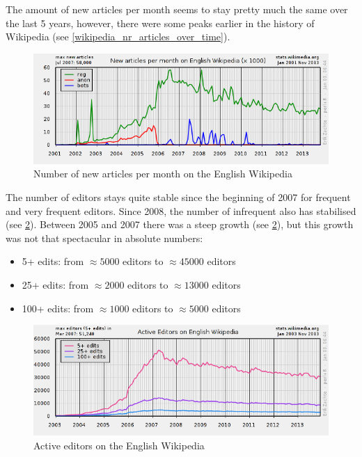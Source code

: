 \documentclass[12pt]{report}
\begin{document}
The amount of new articles per month seems to stay pretty much the
same over the last 5 years, however, there were some peaks earlier in
the history of Wikipedia (see \cref{wikipedia_nr_articles_over_time}).
\begin{figure}[h!]
  \caption{Number of new articles per month on the English Wikipedia}
  \label{wikipedia_new_articles_per_month}
  \centering
    \includegraphics[scale=0.5]{pics/wikipedia_new_articles_per_month.png}
\end{figure}
The number of editors stays quite stable since the beginning of 2007
for frequent and very frequent editors. Since 2008, the number of
infrequent also has stabilised (see \cref{wikipedia_active_editors}). Between 2005 and 2007 there was a
steep growth (see \cref{wikipedia_active_editors}), but this growth was not
that spectacular in absolute numbers:
\begin{itemize}
\item 5+ edits: from $\approx 5000$ editors to $\approx 45000$ editors
\item 25+ edits: from $\approx 2000$ editors to $\approx 13000$ editors
\item 100+ edits: from $\approx 1000$ editors to $\approx 5000$ editors
\end{itemize}
\begin{figure}[h!]
  \caption{Active editors on the English Wikipedia}
  \label{wikipedia_active_editors}
  \centering
    \includegraphics[scale=0.5]{pics/wikipedia_active_editors.png}
\end{figure}
\end{document}
